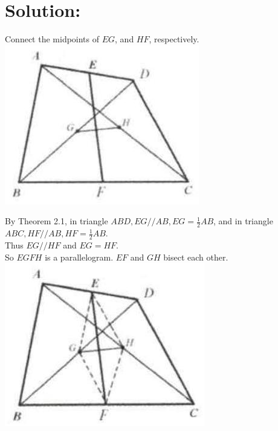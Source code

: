 \documentclass[10pt]{article}
\begin{document}
\section*{Solution:}
Connect the midpoints of \(E G\), and \(H F\), respectively.\\
\includegraphics[max width=\textwidth, center]{2025_04_17_97bc1f7e44d93c271a88g-041(1)}

By Theorem 2.1, in triangle \(A B D, E G / / A B, E G=\frac{1}{2} A B\), and in triangle \(A B C, H F / / A B, H F=\frac{1}{2} A B\).\\
Thus \(E G / / H F\) and \(E G=H F\).\\
So \(E G F H\) is a parallelogram. \(E F\) and \(G H\) bisect each other.\\
\includegraphics[max width=\textwidth, center]{2025_04_17_97bc1f7e44d93c271a88g-042(1)}
\end{document}
